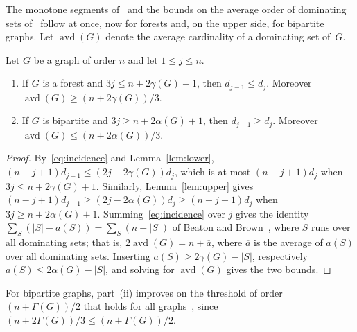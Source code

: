 The monotone segments of~\cite[Theorems~6 and~16]{BS} and the bounds on the
average order of dominating sets of~\cite[Theorem~18]{BS} follow at once,
now for forests and, on the upper side, for bipartite graphs. Let
$\operatorname{avd}(G)$ denote the average cardinality of a dominating set
of~$G$.

\begin{corollary}\label{cor:segments}
Let $G$ be a graph of order $n$ and let $1\le j\le n$.
\begin{enumerate}
\item[\textup{(i)}] If $G$ is a forest and $3j\le n+2\gamma(G)+1$, then
$d_{j-1}\le d_j$. Moreover $\operatorname{avd}(G)\ge(n+2\gamma(G))/3$.
\item[\textup{(ii)}] If $G$ is bipartite and $3j\ge n+2\alpha(G)+1$, then
$d_{j-1}\ge d_j$. Moreover $\operatorname{avd}(G)\le(n+2\alpha(G))/3$.
\end{enumerate}
\end{corollary}

\begin{proof}
By~\eqref{eq:incidence} and Lemma~\ref{lem:lower},
$(n-j+1)d_{j-1}\le(2j-2\gamma(G))d_j$, which is at most $(n-j+1)d_j$ when
$3j\le n+2\gamma(G)+1$. Similarly, Lemma~\ref{lem:upper} gives
$(n-j+1)d_{j-1}\ge(2j-2\alpha(G))d_j\ge(n-j+1)d_j$ when
$3j\ge n+2\alpha(G)+1$. Summing~\eqref{eq:incidence} over $j$ gives the
identity $\sum_S(|S|-a(S))=\sum_S(n-|S|)$ of Beaton and Brown~\cite{BB21},
where $S$ runs over all dominating sets; that is,
$2\operatorname{avd}(G)=n+\overline{a}$, where $\overline a$ is the average of
$a(S)$ over all dominating sets. Inserting $a(S)\ge2\gamma(G)-|S|$,
respectively $a(S)\le2\alpha(G)-|S|$, and solving for
$\operatorname{avd}(G)$ gives the two bounds.
\end{proof}

For bipartite graphs, part~(ii) improves on the threshold of order
$(n+\Gamma(G))/2$ that holds for all graphs~\cite{BO}, since
$(n+2\Gamma(G))/3\le(n+\Gamma(G))/2$.


